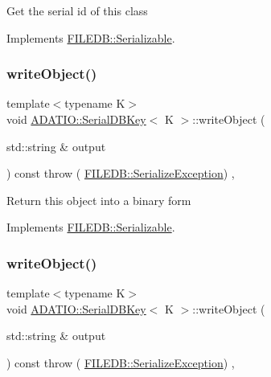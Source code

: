 Get the serial id of this class 

Implements \mbox{\hyperlink{classFILEDB_1_1Serializable_a5d639b5dbd5d8ebc7dca1eca31bbc868}{F\+I\+L\+E\+D\+B\+::\+Serializable}}.

\mbox{\label{classADATIO_1_1SerialDBKey_a6e2d9bbd18a3fa5e049f0ad5321d328a}} 
\subsubsection{\texorpdfstring{writeObject()}{writeObject()}\hspace{0.1cm}{\footnotesize\ttfamily [1/2]}}
{\footnotesize\ttfamily template$<$typename K$>$ \\
void \mbox{\hyperlink{classADATIO_1_1SerialDBKey}{A\+D\+A\+T\+I\+O\+::\+Serial\+D\+B\+Key}}$<$ K $>$\+::write\+Object (\begin{DoxyParamCaption}\item[{std\+::string \&}]{output }\end{DoxyParamCaption}) const throw ( \mbox{\hyperlink{classFILEDB_1_1SerializeException}{F\+I\+L\+E\+D\+B\+::\+Serialize\+Exception}}) \hspace{0.3cm}{\ttfamily [inline]}, {\ttfamily [virtual]}}

Return this object into a binary form 

Implements \mbox{\hyperlink{classFILEDB_1_1Serializable_a8deaa86e108c08c863881e46cf5578ea}{F\+I\+L\+E\+D\+B\+::\+Serializable}}.

\mbox{\label{classADATIO_1_1SerialDBKey_a6e2d9bbd18a3fa5e049f0ad5321d328a}} 
\subsubsection{\texorpdfstring{writeObject()}{writeObject()}\hspace{0.1cm}{\footnotesize\ttfamily [2/2]}}
{\footnotesize\ttfamily template$<$typename K$>$ \\
void \mbox{\hyperlink{classADATIO_1_1SerialDBKey}{A\+D\+A\+T\+I\+O\+::\+Serial\+D\+B\+Key}}$<$ K $>$\+::write\+Object (\begin{DoxyParamCaption}\item[{std\+::string \&}]{output }\end{DoxyParamCaption}) const throw ( \mbox{\hyperlink{classFILEDB_1_1SerializeException}{F\+I\+L\+E\+D\+B\+::\+Serialize\+Exception}}) \hspace{0.3cm}{\ttfamily [inline]}, {\ttfamily [virtual]}}

